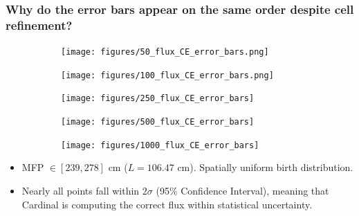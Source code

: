 \documentclass[9pt,t]{beamer}
\begin{document}
\begin{frame}
\frametitle{Why do the error bars appear on the same order despite cell refinement?}
    \pause
    \begin{figure}[T]
        \centering
        \begin{subfigure}{0.32\textwidth}
            \texttt{[image: figures/50\_flux\_CE\_error\_bars.png]}
        \end{subfigure}
        \begin{subfigure}{0.32\textwidth}
            \texttt{[image: figures/100\_flux\_CE\_error\_bars.png]}
        \end{subfigure}
        \begin{subfigure}{0.32\textwidth}
            \texttt{[image: figures/250\_flux\_CE\_error\_bars]}
        \end{subfigure}
        \begin{subfigure}{0.32\textwidth}
            \texttt{[image: figures/500\_flux\_CE\_error\_bars]}
        \end{subfigure}
        \begin{subfigure}{0.32\textwidth}
            \texttt{[image: figures/1000\_flux\_CE\_error\_bars]}
        \end{subfigure}
    \end{figure}
    \begin{itemize}
        \item <3-> MFP $\in[239,278]$ cm ($L=106.47$ cm). Spatially uniform birth distribution.
        \item <4-> Nearly all points fall within $2\sigma$ (95\% Confidence Interval), meaning that Cardinal is computing the correct flux within statistical uncertainty.
    \end{itemize}
\end{frame}

\end{document}
